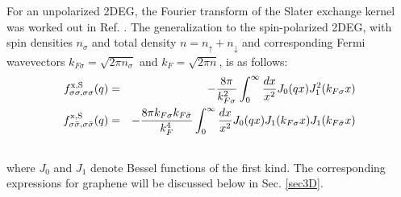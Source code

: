 \documentclass[aps,prb,twocolumn,superscriptaddress]{revtex4-2}
\newcommand{\ua}{\uparrow}
\newcommand{\da}{\downarrow}
\begin{document}
For an unpolarized 2DEG, the Fourier transform of the Slater exchange kernel was worked out in Ref. \cite{Karimi2014}.
The generalization to the spin-polarized 2DEG, with spin densities $n_\sigma$ and total density $n = n_\ua+n_\da$
and corresponding Fermi wavevectors  $k_{F\sigma} = \sqrt{2\pi n_\sigma}$ and $k_F = \sqrt{2\pi n}$, is as follows:
\begin{eqnarray}
f^{\rm x,S}_{\sigma\sigma,\sigma\sigma}(q) &=& -\frac{8\pi}{k_{F\sigma}^2} \int_0^\infty \frac{dx}{x^2} J_0(qx)J_1^2(k_{F\sigma}x)\\
f^{\rm x,S}_{\sigma\bar\sigma,\sigma\bar\sigma}(q) &=& -\frac{8\pi k_{F\sigma}k_{F\bar\sigma}}{k_{F}^4} \int_0^\infty \frac{dx}{x^2} J_0(qx)J_1(k_{F\sigma}x)J_1(k_{F\bar\sigma}x)
\nonumber\\
&&
\end{eqnarray}
where $J_0$ and $J_1$ denote Bessel functions of the first kind.
The corresponding expressions for graphene will be discussed below in Sec. \ref{sec3D}.
\end{document}
